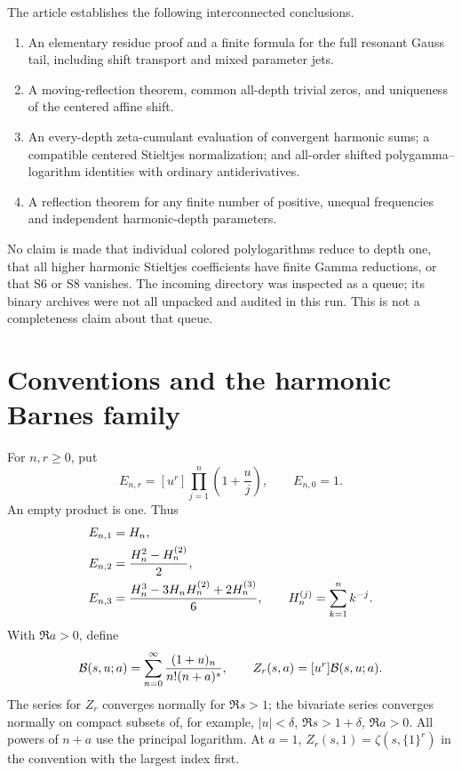 The article establishes the following interconnected conclusions.
\begin{enumerate}[label=\arabic*.]
\item An elementary residue proof and a finite formula for the full
resonant Gauss tail, including shift transport and mixed parameter jets.
\item A moving-reflection theorem, common all-depth trivial zeros,
and uniqueness of the centered affine shift.
\item An every-depth zeta-cumulant evaluation of convergent harmonic sums;
a compatible centered Stieltjes normalization; and all-order shifted
polygamma--logarithm identities with ordinary antiderivatives.
\item A reflection theorem for any finite number of positive, unequal
frequencies and independent harmonic-depth parameters.
\end{enumerate}
No claim is made that individual colored polylogarithms reduce to depth
one, that all higher harmonic Stieltjes coefficients have finite Gamma
reductions, or that S6 or S8 vanishes. The incoming directory was inspected
as a queue; its binary archives were not all unpacked and audited in this
run. This is not a completeness claim about that queue.

\section{Conventions and the harmonic Barnes family}
\label{agrc:preliminaries}

For $n,r\geq0$, put
\begin{equation}\label{agrc:elementary}
 E_{n,r}=[u^r]\prod_{j=1}^{n}\left(1+\frac uj\right),
 \qquad E_{n,0}=1.
\end{equation}
An empty product is one. Thus
\begin{align}
 E_{n,1}&=H_n,\notag\\
 E_{n,2}&=\frac{H_n^2-H_n^{(2)}}2,\notag\\
 E_{n,3}&=\frac{H_n^3-3H_nH_n^{(2)}+2H_n^{(3)}}6,
 \qquad H_n^{(j)}=\sum_{k=1}^n k^{-j}.\label{agrc:elementary-examples}
\end{align}
With $\Re a>0$, define
\begin{equation}\label{agrc:BZ}
 \mathcal B(s,u;a)=\sum_{n=0}^{\infty}
       \frac{(1+u)_n}{n!(n+a)^s},
 \qquad Z_r(s,a)=[u^r]\mathcal B(s,u;a).
\end{equation}
The series for $Z_r$ converges normally for $\Re s>1$; the bivariate
series converges normally on compact subsets of, for example,
$|u|<\delta$, $\Re s>1+\delta$, $\Re a>0$.
All powers of $n+a$ use the principal logarithm. At $a=1$,
$Z_r(s,1)=\zeta(s,\{1\}^r)$ in the convention with the largest index first.


